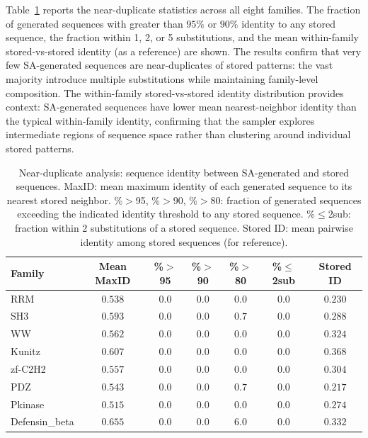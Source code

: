 Table~\ref{tab:identity-dist} reports the near-duplicate statistics across all eight families. The fraction of generated sequences with greater than $95\%$ or $90\%$ identity to any stored sequence, the fraction within 1, 2, or 5 substitutions, and the mean within-family stored-vs-stored identity (as a reference) are shown. The results confirm that very few SA-generated sequences are near-duplicates of stored patterns: the vast majority introduce multiple substitutions while maintaining family-level composition. The within-family stored-vs-stored identity distribution provides context: SA-generated sequences have lower mean nearest-neighbor identity than the typical within-family identity, confirming that the sampler explores intermediate regions of sequence space rather than clustering around individual stored patterns.

\begin{table}[ht]
\centering
\caption{Near-duplicate analysis: sequence identity between SA-generated and stored sequences. MaxID: mean maximum identity of each generated sequence to its nearest stored neighbor. \%$>$95, \%$>$90, \%$>$80: fraction of generated sequences exceeding the indicated identity threshold to any stored sequence. \%$\leq$2sub: fraction within 2 substitutions of a stored sequence. Stored ID: mean pairwise identity among stored sequences (for reference).}
\label{tab:identity-dist}
\small
\begin{tabular}{@{}lcccccc@{}}
\toprule
Family & Mean MaxID & \%$>$95 & \%$>$90 & \%$>$80 & \%$\leq$2sub & Stored ID \\
\midrule
RRM            & $0.538$ & $0.0$ & $0.0$ & $0.0$ & $0.0$ & $0.230$ \\
SH3            & $0.593$ & $0.0$ & $0.0$ & $0.7$ & $0.0$ & $0.288$ \\
WW             & $0.562$ & $0.0$ & $0.0$ & $0.0$ & $0.0$ & $0.324$ \\
Kunitz         & $0.607$ & $0.0$ & $0.0$ & $0.0$ & $0.0$ & $0.368$ \\
zf-C2H2        & $0.557$ & $0.0$ & $0.0$ & $0.0$ & $0.0$ & $0.304$ \\
PDZ            & $0.543$ & $0.0$ & $0.0$ & $0.7$ & $0.0$ & $0.217$ \\
Pkinase        & $0.515$ & $0.0$ & $0.0$ & $0.0$ & $0.0$ & $0.274$ \\
Defensin\_beta & $0.655$ & $0.0$ & $0.0$ & $6.0$ & $0.0$ & $0.332$ \\
\bottomrule
\end{tabular}
\end{table}


